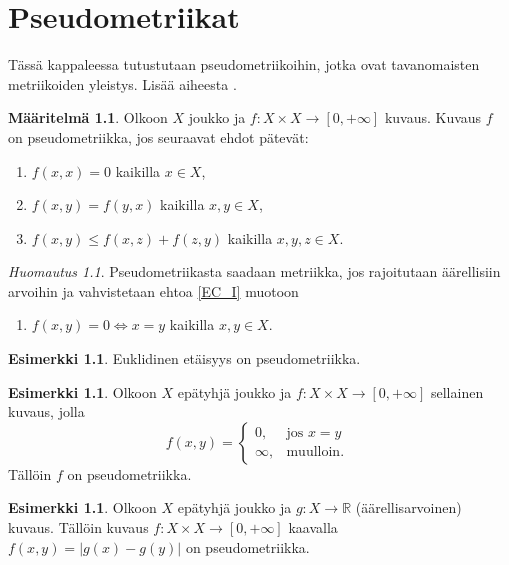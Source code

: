 \documentclass[12pt,a4paper,leqno]{report}
\newcommand{\R}{\mathbb{R}}
\theoremstyle{plain}
\theoremstyle{definition}
\newtheorem{maar}[equation]{Määritelmä}
\newtheorem{esim}[equation]{Esimerkki}
\theoremstyle{remark}
\newtheorem{huom}[equation]{Huomautus}
\begin{document}
\chapter{Pseudometriikat}
Tässä kappaleessa tutustutaan pseudometriikoihin, jotka ovat tavanomaisten metriikoiden yleistys. Lisää aiheesta \cite{Eom2}.
\begin{maar}
Olkoon $X$ joukko ja $f\colon X\times X\rightarrow [0,+\infty]$ 
kuvaus. Kuvaus $f$ on pseudometriikka, jos seuraavat ehdot pätevät:
\begin{enumerate} [label=(P\arabic*),ref=(P\arabic*)]
\item\label{EC_I} $f(x,x)=0$ kaikilla $x\in X$,
\item\label{EC_II} $f(x,y)=f(y,x)$ kaikilla $x,y\in X$,
\item\label{EC_III} $f(x,y)\leq f(x,z)+f(z,y)$ kaikilla $x,y,z\in X$.
\end{enumerate}
\end{maar}
\begin{huom}
Pseudometriikasta saadaan metriikka, jos rajoitutaan äärellisiin arvoihin ja vahvistetaan ehtoa \ref{EC_I} muotoon
\begin{enumerate} [label=(M\arabic*),ref=(M\arabic*)]
\item\label{M1} $f(x,y)=0\Leftrightarrow x=y$ kaikilla $x,y\in X.$
\end{enumerate}
\end{huom}
\begin{esim}%
Euklidinen etäisyys on pseudometriikka.
\end{esim}
\begin{esim}%
Olkoon $X$ epätyhjä joukko ja $f\colon X\times X\rightarrow [0,+\infty]$ sellainen kuvaus, jolla
\begin{equation*}
f(x,y) = \begin{cases} 0, & \mbox{jos } x=y\\
\infty, & \mbox{muulloin. } \end{cases}
\end{equation*}
Tällöin $f$ on pseudometriikka.
\end{esim}
\begin{esim}%
Olkoon $X$ epätyhjä joukko ja $g\colon X\rightarrow \R$ (äärellisarvoinen) kuvaus. Tällöin kuvaus $f\colon X\times X\rightarrow[0,+\infty]$ kaavalla $f(x,y)=|g(x)-g(y)|$ on pseudometriikka.
\end{esim}
\end{document}
